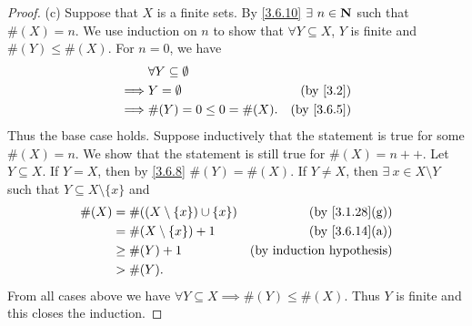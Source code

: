 \begin{proof}{(c)}
  Suppose that \(X\) is a finite sets.
  By \cref{3.6.10} \(\exists\ n \in \N\) such that \(\#(X) = n\).
  We use induction on \(n\) to show that \(\forall Y \subseteq X\), \(Y\) is finite and \(\#(Y) \leq \#(X)\).
  For \(n = 0\), we have
  \begin{align*}
             & \forall Y \subseteq \emptyset                            \\
    \implies & Y = \emptyset                 & \text{(by \cref{3.2})}   \\
    \implies & \#(Y) = 0 \leq 0 = \#(X).     & \text{(by \cref{3.6.5})}
  \end{align*}
  Thus the base case holds.
  Suppose inductively that the statement is true for some \(\#(X) = n\).
  We show that the statement is still true for \(\#(X) = n++\).
  Let \(Y \subseteq X\).
  If \(Y = X\), then by \cref{3.6.8} \(\#(Y) = \#(X)\).
  If \(Y \neq X\), then \(\exists\ x \in X \setminus Y\) such that \(Y \subseteq X \setminus \{x\}\) and
  \begin{align*}
    \#(X) & = \#((X \setminus \{x\}) \cup \{x\}) & \text{(by \cref{3.1.28}(g))}     \\
          & = \#(X \setminus \{x\}) + 1          & \text{(by \cref{3.6.14}(a))}     \\
          & \geq \#(Y) + 1                       & \text{(by induction hypothesis)} \\
          & > \#(Y).
  \end{align*}
  From all cases above we have \(\forall Y \subseteq X \implies \#(Y) \leq \#(X)\).
  Thus \(Y\) is finite and this closes the induction.


\end{proof}
